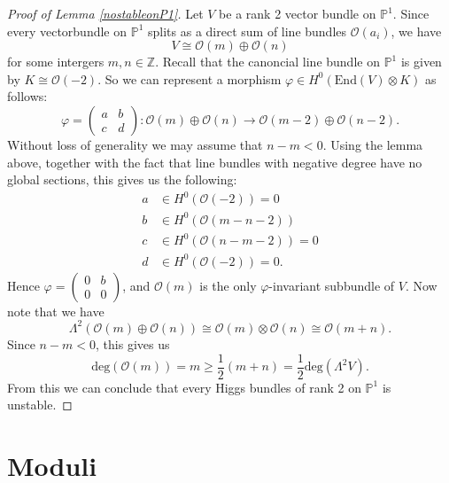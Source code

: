 \begin{proof}[Proof of Lemma \ref{nostableonP1}]
	Let $V$ be a rank 2 vector bundle on $\mathbb{P} ^1 $. Since every vectorbundle on $\mathbb{P}^1$ splits as a direct sum of line bundles $\mathcal{O}(a_i)$, we have 
	\[
	V \cong \mathcal{O} (m) \oplus \mathcal{O} (n)
	\]
	for some intergers $m,n \in \mathbb{Z}$. Recall that the canoncial line bundle on $\mathbb{P}^1$ is given by $K\cong \mathcal{O}(-2)$. So we can represent a morphism $\varphi \in H^0(\mathrm{End}(V)\otimes K)$ as follows: 
	\[
	\varphi = \begin{pmatrix}
	a&b\\c&d
	\end{pmatrix}:\mathcal{O} ( m) \oplus \mathcal{O} ( n) \rightarrow  \mathcal{O} (m -2) \oplus \mathcal{O} (n-2).
	\]
	Without loss of generality we may assume that $n-m<0$. Using the lemma above, together with the fact that line bundles with negative degree have no global sections, this gives us the following:
	\begin{align*}
		a &\in H^0(\mathcal{O}(-2)) = 0 \\
		b &\in H^0(\mathcal{O}(m-n-2)) \\
		c &\in H^0(\mathcal{O}(n-m-2))=0 \\ 
		d &\in H^0(\mathcal{O}(-2))=0.
	\end{align*}
 	Hence $\varphi = \begin{pmatrix} 0&b\\0&0 \end{pmatrix}$, and $\mathcal{O}(m)$ is the only $\varphi$-invariant subbundle of $V$. Now note that we have 
 	\[
 	\Lambda^2(\mathcal{O} ( m) \oplus \mathcal{O} (n)) \cong \mathcal{O}(m) \otimes \mathcal{O}(n) \cong \mathcal{O} (m+n).
 	\]
 	Since $n-m<0$, this gives us 
 	\[
 	\mathrm{deg}(\mathcal{O}(m)) = m \geq \frac12(m+n) = \frac12\mathrm{deg}(\Lambda^2V).
 	\]
 	From this we can conclude that every Higgs bundles of rank 2 on $\mathbb{P} ^1$ is unstable.
\end{proof}
 


\section{Moduli} %


